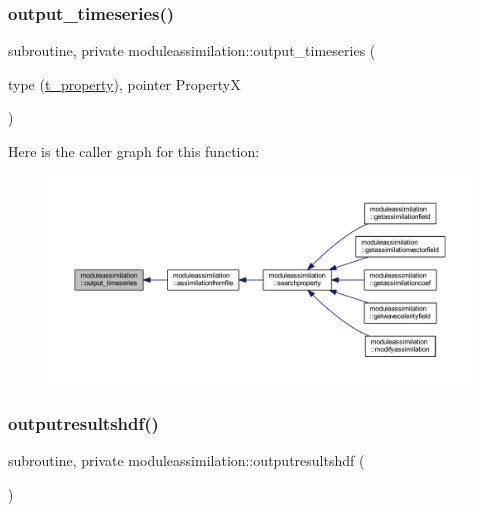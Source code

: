 \subsubsection{\texorpdfstring{output\+\_\+timeseries()}{output\_timeseries()}}
{\footnotesize\ttfamily subroutine, private moduleassimilation\+::output\+\_\+timeseries (\begin{DoxyParamCaption}\item[{type (\mbox{\hyperlink{structmoduleassimilation_1_1t__property}{t\+\_\+property}}), pointer}]{PropertyX }\end{DoxyParamCaption})\hspace{0.3cm}{\ttfamily [private]}}

Here is the caller graph for this function\+:\nopagebreak
\begin{figure}[H]
\begin{center}
\leavevmode
\includegraphics[width=350pt]{namespacemoduleassimilation_a4802b71b408a488941f1becab34042ec_icgraph}
\end{center}
\end{figure}
\mbox{\label{namespacemoduleassimilation_a48b30161fd16a556f8e54eeaf6b054e3}} 
\subsubsection{\texorpdfstring{outputresultshdf()}{outputresultshdf()}}
{\footnotesize\ttfamily subroutine, private moduleassimilation\+::outputresultshdf (\begin{DoxyParamCaption}{ }\end{DoxyParamCaption})\hspace{0.3cm}{\ttfamily [private]}}

